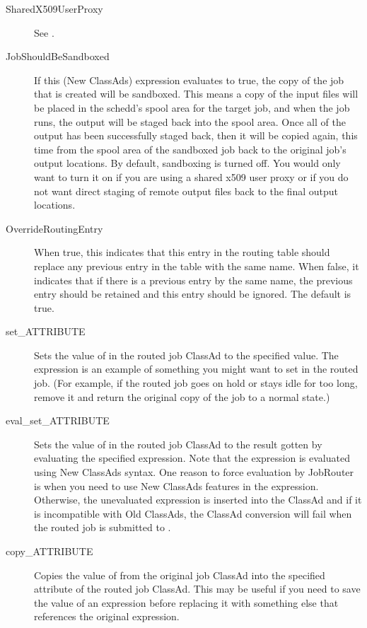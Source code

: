 \begin{description}
\begin{description}
\item[SharedX509UserProxy] See .

\item[JobShouldBeSandboxed] If this (New ClassAds) expression
evaluates to true, the copy of the job that is created will be
sandboxed.  This means a copy of the input files will be placed in the
schedd's spool area for the target job, and when the job runs, the
output will be staged back into the spool area.  Once all of the
output has been successfully staged back, then it will be copied
again, this time from the spool area of the sandboxed job back to the
original job's output locations.  By default, sandboxing is turned
off.  You would only want to turn it on if you are using a shared x509
user proxy or if you do not want direct staging of remote output files
back to the final output locations.

\item[OverrideRoutingEntry] When true, this indicates that this entry
in the routing table should replace any previous entry in the table
with the same name.  When false, it indicates that if there is a
previous entry by the same name, the previous entry should be retained
and this entry should be ignored.  The default is true.

\item[set\_ATTRIBUTE] Sets the value of  in the routed
job ClassAd to the specified value.  The 
expression is an example of something you might want to set in the
routed job.  (For example, if the routed job goes on hold or stays
idle for too long, remove it and return the original copy of the job to
a normal state.)

\item[eval\_set\_ATTRIBUTE] Sets the value of  in the
routed job ClassAd to the result gotten by evaluating the specified
expression.  Note that the expression is evaluated using New ClassAds
syntax.  One reason to force evaluation by JobRouter is when you need
to use New ClassAds features in the expression.  Otherwise, the
unevaluated expression is inserted into the ClassAd and if it is
incompatible with Old ClassAds, the ClassAd conversion will fail when
the routed job is submitted to .

\item[copy\_ATTRIBUTE] Copies the value of  from the
original job ClassAd into the specified attribute of the routed job
ClassAd.  This may be useful if you need to save the value of an
expression before replacing it with something else that references the
original expression.


\end{description}
\end{description}
